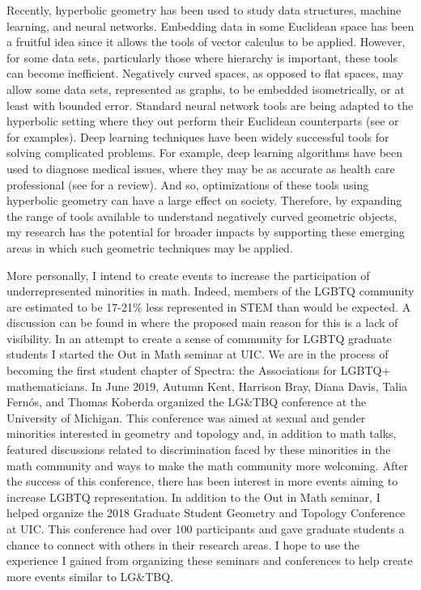 \documentclass[11pt]{amsart}
\begin{document}
Recently, hyperbolic geometry has been used to study data structures, machine learning, and neural networks. Embedding data in some Euclidean space has been a fruitful idea since it allows the tools of vector calculus to be applied. However, for some data sets, particularly those where hierarchy is important, these tools can become inefficient. Negatively curved spaces, as opposed to flat spaces, may allow some data sets, represented as graphs, to be embedded isometrically, or at least with bounded error. Standard neural network tools are being adapted to the hyperbolic setting where they out perform their Euclidean counterparts (see \cite{ganea2018} or \cite{desa2018} for examples). Deep learning techniques have been widely successful tools for solving complicated problems. For example, deep learning algorithms have been used to diagnose medical issues, where they may be as accurate as health care professional (see \cite{xiaoxuan-faes2019} for a review). And so, optimizations of these tools using hyperbolic geometry can have a large effect on society. Therefore, by expanding the range of tools available to understand negatively curved geometric objects, my research has the potential for broader impacts by supporting these emerging areas in which such geometric techniques may be applied.



More personally, I intend to create events to increase the participation of underrepresented minorities in math. Indeed, members of the LGBTQ community are estimated to be 17-21\% less represented in STEM than would be expected. A discussion can be found in  \cite{freeman2018} where the proposed main reason for this is a lack of visibility. In an attempt to create a sense of community for LGBTQ graduate students I started the Out in Math seminar at UIC. We are in the process of becoming the first student chapter of Spectra: the Associations for LGBTQ+ mathematicians. In June 2019,  Autumn Kent, Harrison Bray, Diana Davis, Talia Fern\'os, and Thomas Koberda organized the LG\&TBQ conference at the University of Michigan. This conference was aimed at sexual and gender minorities interested in geometry and topology and, in addition to math talks, featured discussions related to discrimination faced by these minorities in the math community and ways to make the math community more welcoming. After the success of this conference, there has been interest in more events aiming to increase LGBTQ representation. In addition to the Out in Math seminar, I helped organize the 2018 Graduate Student Geometry and Topology Conference at UIC. This conference had over 100 participants and gave graduate students a chance to connect with others in their research areas. I hope to use the experience I gained from organizing these seminars and conferences to help create more events similar to LG\&TBQ.  




\end{document}
